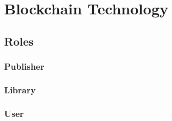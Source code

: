 \chapter{Blockchain Technology\label{cha:chapter1}}


\section{Roles\label{sec:ziel}}
\subsection{Publisher}
\subsection{Library}
\subsection{User}
